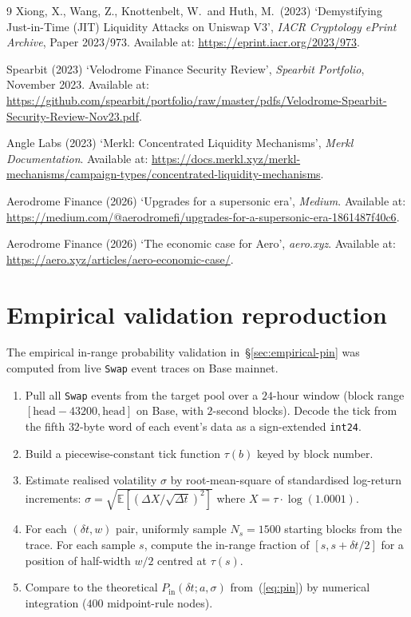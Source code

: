 \documentclass[11pt,a4paper]{article}
\theoremstyle{cgdefinition}
\theoremstyle{cgplain}
\theoremstyle{cgremark}
\begin{document}
\begin{thebibliography}{9}
Xiong, X., Wang, Z., Knottenbelt, W.\ and Huth, M.\ (2023) `Demystifying Just-in-Time (JIT) Liquidity Attacks on Uniswap V3', \textit{IACR Cryptology ePrint Archive}, Paper 2023/973. Available at: \url{https://eprint.iacr.org/2023/973}.

Spearbit (2023) `Velodrome Finance Security Review', \textit{Spearbit Portfolio}, November 2023. Available at: \url{https://github.com/spearbit/portfolio/raw/master/pdfs/Velodrome-Spearbit-Security-Review-Nov23.pdf}.

Angle Labs (2023) `Merkl: Concentrated Liquidity Mechanisms', \textit{Merkl Documentation}. Available at: \url{https://docs.merkl.xyz/merkl-mechanisms/campaign-types/concentrated-liquidity-mechanisms}.

Aerodrome Finance (2026) `Upgrades for a supersonic era', \textit{Medium}. Available at: \url{https://medium.com/@aerodromefi/upgrades-for-a-supersonic-era-1861487f40c6}.

Aerodrome Finance (2026) `The economic case for Aero', \textit{aero.xyz}. Available at: \url{https://aero.xyz/articles/aero-economic-case/}.

\end{thebibliography}

\clearpage
\appendix

\section{Empirical validation reproduction}\label{app:reproduction}

The empirical in-range probability validation in~\S\ref{sec:empirical-pin} was computed from live \texttt{Swap} event traces on Base mainnet.

\begin{enumerate}[leftmargin=2em]
\item Pull all \texttt{Swap} events from the target pool over a $24$-hour window (block range $[\text{head} - 43200, \text{head}]$ on Base, with $2$-second blocks). Decode the tick from the fifth $32$-byte word of each event's data as a sign-extended \texttt{int24}.
\item Build a piecewise-constant tick function $\tau(b)$ keyed by block number.
\item Estimate realised volatility $\sigma$ by root-mean-square of standardised log-return increments: $\sigma = \sqrt{\mathbb{E}[(\Delta X / \sqrt{\Delta t})^2]}$ where $X = \tau \cdot \log(1.0001)$.
\item For each $(\delta t, w)$ pair, uniformly sample $N_s = 1500$ starting blocks from the trace. For each sample $s$, compute the in-range fraction of $[s, s + \delta t / 2]$ for a position of half-width $w/2$ centred at $\tau(s)$.
\item Compare to the theoretical $P_{\text{in}}(\delta t; a, \sigma)$ from~(\ref{eq:pin}) by numerical integration ($400$ midpoint-rule nodes).
\end{enumerate}
\end{document}
